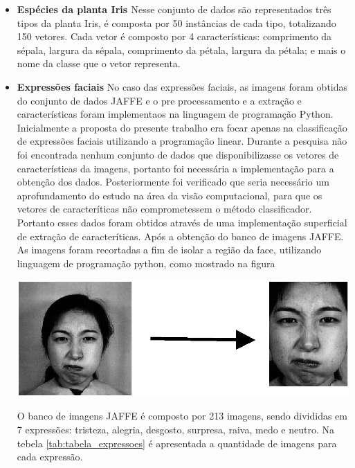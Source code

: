 \begin{itemize}
\item \textbf{Espécies da planta Iris \cite{Iris}}
Nesse conjunto de dados são representados três tipos da planta Iris, é composta por 50 instâncias de cada tipo, totalizando 150 vetores. Cada vetor é composto por 4 características: comprimento da sépala, largura da sépala, comprimento da pétala, largura da pétala; e mais o nome da classe que o vetor representa.

\item \textbf{Expressões faciais}
No caso das expressões faciais, as imagens foram obtidas do conjunto de dados JAFFE \cite{Jaffe} e o pre processamento e a extração e características foram implementaos na linguagem de programação Python.
Inicialmente a proposta do presente trabalho era focar apenas na classificação de expressões faciais utilizando a programação linear. Durante a pesquisa não foi encontrada nenhum conjunto de dados que disponibilizasse os vetores de características da imagens, portanto foi necessária a implementação para a obtenção dos dados. Posteriormente foi verificado que seria necessário um aprofundamento do estudo na área da visão computacional, para que os vetores de caracteríticas não comprometessem o método classificador. Portanto esses dados foram obtidos através de uma implementação superficial de extração de caracteríticas.
Após a obtenção do banco de imagens JAFFE. As imagens foram recortadas a fim de isolar a região da face, utilizando linguagem de programação python, como mostrado na figura

\begin{center}
	\includegraphics[scale=0.5]{graficos/jaffe}
	\label{img:jaffe}
\end{center}

O banco de imagens JAFFE é composto por 213 imagens, sendo divididas em 7 expressões: tristeza, alegria, desgosto, surpresa, raiva, medo e neutro. Na tebela \ref{tab:tabela_expressoes} é apresentada a quantidade de imagens para cada expressão.


\end{itemize}
